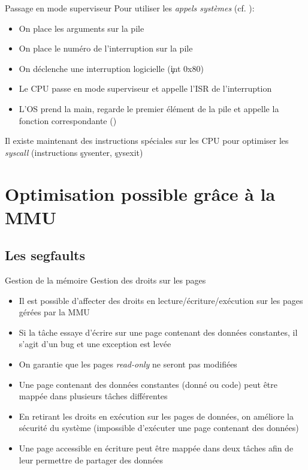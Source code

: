 \begin{frame}{Passage en mode superviseur}
  Pour utiliser les \emph{appels systèmes} (cf. ):
  \begin{itemize}
  \item On place les arguments sur la pile
  \item On place le numéro de l'interruption sur la pile
  \item On déclenche une interruption logicielle (\c{int 0x80})
  \item  Le  CPU  passe  en  mode  superviseur  et  appelle  l'ISR  de
    l'interruption
  \item L'OS prend  la main, regarde le premier élément  de la pile et
    appelle la fonction correspondante ()
  \end{itemize}
  Il  existe maintenant des  instructions spéciales  sur les  CPU pour
  optimiser    les    \emph{syscall}    (instructions    \c{sysenter},
  \c{sysexit})
\end{frame}

\section{Optimisation possible grâce à la MMU}

\subsection{Les segfaults}

\begin{frame}{Gestion de la mémoire}
  Gestion des droits sur les pages
  \begin{itemize}
  \item    Il    est     possible    d'affecter    des    droits    en
    lecture/écriture/exécution sur les pages gérées par la MMU
  \item Si la tâche essaye d'écrire sur une page contenant des données
    constantes, il s'agit d'un bug et une exception est levée
  \item  On garantie  que  les pages  \emph{read-only}  ne seront  pas
    modifiées
  \item Une page contenant des données constantes (donné ou code) peut
    être mappée dans plusieurs tâches différentes
  \item En retirant les droits  en exécution sur les pages de données,
    on améliore la sécurité du système (impossible d'exécuter une page
    contenant des données)
  \item Une  page accessible  en écriture peut  être mappée  dans deux
    tâches afin de leur permettre de partager des données
  \end{itemize}
\end{frame}

